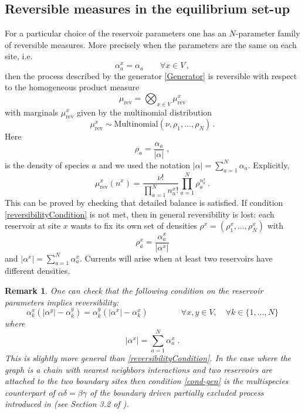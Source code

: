 \documentclass[10pt]{article}
\numberwithin{equation}{section}
\numberwithin{equation}{subsection}
\newtheorem{remark}{Remark}
\newcommand{\co}{\;,}
\newcommand{\dt}{\;.}
\newcommand{\twoj}{\nu}
\begin{document}
\subsection{Reversible measures in the equilibrium set-up}
For a particular choice of the reservoir parameters one has an $N$-parameter family of reversible measures. More precisely
when the parameters are the same on each site, i.e.
\begin{equation}\label{reversibilityCondition}
\alpha_{a}^{x}=\alpha_{a}\qquad \forall x\in V\,,
\end{equation}
then the process described by the generator \eqref{Generator} is reversible with respect to the 
homogeneous product measure 
\begin{equation}
\label{reversibleMeasure}
\mu_{\text{rev}}=\bigotimes_{x\in V}\mu_{\text{rev}}^{x}
\end{equation}
with marginals $\mu_{\text{rev}}^{x}$ given by  the multinomial distribution
\begin{equation}
 \mu^{x}_{\text{rev}}\sim \text{Multinomial}\left(\twoj,\rho_{1},\ldots,\rho_{N}\right)\,.
\end{equation}
Here
 $$
\rho_{a}=\frac{\alpha_{a}}{|\alpha|}\co
$$
is the density of species $a$ and we used the notation $|\alpha|=\sum_{a=1}^{N}\alpha_{a}$. Explicitly, 
\begin{equation}
\mu_{\text{rev}}^{x}(n^{x})=\frac{\nu!}{\prod_{a=1}^{N}n_{a}^{x}!}\prod_{a=1}^{N}\rho_{a}^{n_{a}^{x}}\,.
\end{equation}
This can be proved  by checking that detailed balance is satisfied. 
If condition \eqref{reversibilityCondition} is not met, then in general reversibility is lost: 
each reservoir at site $x$ {\color{red}wants to fix} its own set of densities $\rho^{x}=(\rho_{1}^{x},\ldots,\rho_{N}^{x})$ with
\begin{equation}
\label{rhox}
\rho_{a}^x=\frac{\alpha_{a}^x}{|\alpha^x|}
\end{equation}
and  $|\alpha^x|=\sum_{a=1}^{N}\alpha_{a}^x$.
Currents will arise when at least two reservoirs have different densities. 
\begin{remark}
\label{rem-rev}
		One can check that the following condition on the reservoir parameters implies reversibility:
		\begin{equation}
		\label{cond-gen}
			\alpha_{k}^{x}\left(|\alpha^{y}|-\alpha_{k}^{y}\right)=\alpha_{k}^{y}\left(|\alpha^{x}|-\alpha_{k}^{x}\right)\qquad\qquad \forall x,y\in V,\quad \forall k\in \{1,\ldots,N\}
		\end{equation}
		where
		\begin{equation}
			|\alpha^{x}|=\sum_{a=1}^{N}\alpha_{a}^{x}\dt
		\end{equation}
		This is slightly more general than \eqref{reversibilityCondition}. In the case where the graph is a chain with nearest neighbors interactions and two reservoirs are attached to the two boundary sites
		then condition \eqref{cond-gen} is the multispecies counterpart of $\alpha\delta=\beta\gamma$ of the boundary driven partially excluded process introduced in \cite{schutzSandow} (see Section 3.2 of \cite{carinci2013duality}).
		\end{remark}
\end{document}
